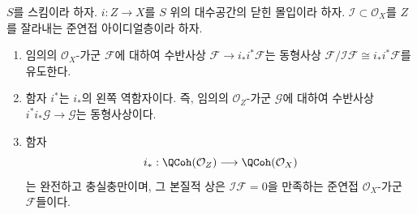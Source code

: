\begin{lemma}
\label{lemma-i-star-equivalence}
$S$를 스킴이라 하자. $i : Z \to X$를 $S$ 위의 대수공간의
닫힌 몰입이라 하자. $\mathcal{I} \subset \mathcal{O}_X$를
$Z$를 잘라내는 준연접 아이디얼층이라 하자.
\begin{enumerate}
\item 임의의 $\mathcal{O}_X$-가군 $\mathcal{F}$에 대하여
수반사상 $\mathcal{F} \to i_*i^*\mathcal{F}$는 동형사상
$\mathcal{F}/\mathcal{I}\mathcal{F} \cong i_*i^*\mathcal{F}$를 유도한다.
\item 함자 $i^*$는 $i_*$의 왼쪽 역함자이다. 즉, 임의의
$\mathcal{O}_Z$-가군 $\mathcal{G}$에 대하여 수반사상
$i^*i_*\mathcal{G} \to \mathcal{G}$는 동형사상이다.
\item 함자
$$
i_* :
\QCoh(\mathcal{O}_Z)
\longrightarrow
\QCoh(\mathcal{O}_X)
$$
는 완전하고 충실충만이며, 그 본질적 상은
$\mathcal{I}\mathcal{F} = 0$을 만족하는 준연접
$\mathcal{O}_X$-가군 $\mathcal{F}$들이다.
\end{enumerate}
\end{lemma}

